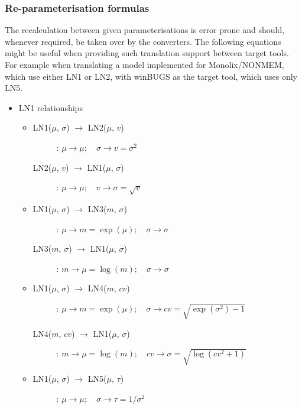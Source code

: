 {\subsubsection{Re-parameterisation formulas}
\label{subsubsec:formulas}
The recalculation between given parameterisations is error prone 
and should, whenever required, be taken over by the converters. The 
following equations might be useful when providing such translation support 
between target tools. For example when translating a model implemented 
for Monolix/NONMEM, which use either LN1 or LN2, with winBUGS as the 
target tool, which uses only LN5.\\
\begin{itemize}
\item 
LN1 relationships
\begin{itemize}
\item 
\begin{description}
\item[LN1($\mu$, $\sigma$) $\rightarrow$ LN2($\mu$, $v$)]:
$\mu \rightarrow \mu; \quad \sigma \rightarrow v=\sigma^2$

\item[LN2($\mu$, $v$) $\rightarrow$ LN1($\mu$, $\sigma$)]:
$\mu \rightarrow \mu; \quad v \rightarrow \sigma = \sqrt{v}$
\end{description}

\item 
\begin{description}
\item[LN1($\mu$, $\sigma$) $\rightarrow$ LN3($m$, $\sigma$)]:
$\mu \rightarrow m=\exp(\mu); \quad \sigma \rightarrow \sigma$

\item[LN3($m$, $\sigma$) $\rightarrow$ LN1($\mu$, $\sigma$)]:
$m \rightarrow \mu=\log(m); \quad \sigma \rightarrow \sigma$
\end{description}

\item 
\begin{description}
\item[LN1($\mu$, $\sigma$) $\rightarrow$ LN4($m$, $cv$)]:
$\mu \rightarrow m=\exp(\mu); \quad \sigma \rightarrow cv=\sqrt{\exp(\sigma^2)-1}$

\item[LN4($m$, $cv$) $\rightarrow$ LN1($\mu$, $\sigma$)]:
$m \rightarrow \mu=\log(m); \quad cv \rightarrow \sigma=\sqrt{\log(cv^2 + 1)}$
\end{description}

\item 
\begin{description}
\item[LN1($\mu$, $\sigma$) $\rightarrow$ LN5($\mu$, $\tau$)]:
$\mu \rightarrow \mu; \quad \sigma \rightarrow \tau=1/\sigma^2$


\end{description}
\end{itemize}
\end{itemize}}
